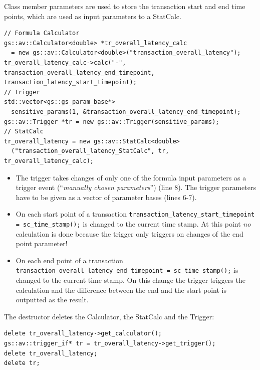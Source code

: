 Class member parameters are used to store the transaction start and end time points, which are used as input parameters to a StatCalc.

\begin{lstlisting}
// Formula Calculator
gs::av::Calculator<double> *tr_overall_latency_calc
  = new gs::av::Calculator<double>("transaction_overall_latency");
tr_overall_latency_calc->calc("-", transaction_overall_latency_end_timepoint, transaction_latency_start_timepoint);
// Trigger
std::vector<gs::gs_param_base*> 
  sensitive_params(1, &transaction_overall_latency_end_timepoint);
gs::av::Trigger *tr = new gs::av::Trigger(sensitive_params);
// StatCalc
tr_overall_latency = new gs::av::StatCalc<double>
  ("transaction_overall_latency_StatCalc", tr, tr_overall_latency_calc);
\end{lstlisting}

\begin{itemize}
	\item  The trigger takes changes of only one of the formula input parameters as a trigger event (``{\em manually chosen parameters}'') (line 8). The trigger parameters have to be given as a vector of parameter bases (lines 6-7).
	
	\item On each start point of a transaction \newline 
	\lstinline|transaction_latency_start_timepoint = sc_time_stamp();|\newline
	is changed to the current time stamp. At this point {\em no} calculation is done because the trigger only triggers on changes of the end point parameter!
	
	\item  On each end point of a transaction \newline
	\lstinline|transaction_overall_latency_end_timepoint = sc_time_stamp();| \newline
	is changed to the current time stamp. On this change the trigger triggers the calculation and the difference between the end and the start point is outputted as the result.

\end{itemize}

The destructor deletes the Calculator, the StatCalc and the Trigger: \newline
\noindent
\begin{minipage}{\textwidth}
\begin{lstlisting}
delete tr_overall_latency->get_calculator();
gs::av::trigger_if* tr = tr_overall_latency->get_trigger();
delete tr_overall_latency;
delete tr;
\end{lstlisting}
\end{minipage}

